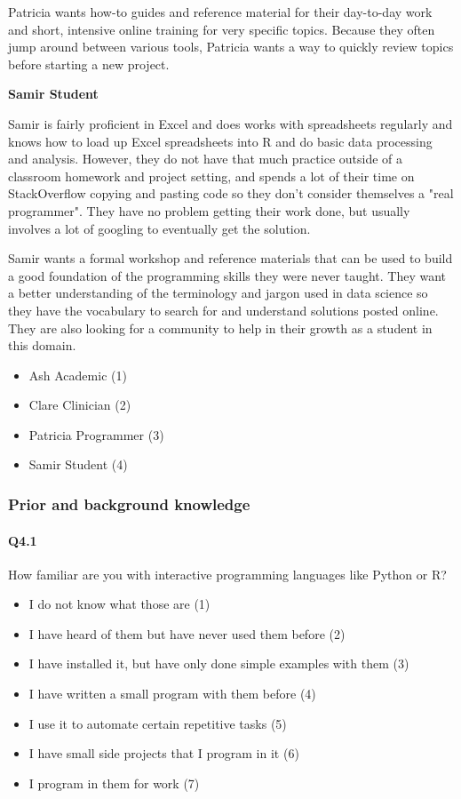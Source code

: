 \documentclass[030-workshop.tex]{subfiles}
\begin{document}
 Patricia wants how-to guides and reference material for their day-to-day work
 and short, intensive online training for very specific topics.
 Because they often jump around between various tools, Patricia wants a way to quickly review topics before starting a new project.

\textbf{Samir Student}

 Samir is fairly proficient in Excel and does works with spreadsheets regularly and
 knows how to load up Excel spreadsheets into R and do basic data processing and analysis.
 However, they do not have that much practice outside of a classroom homework and project setting,
 and spends a lot of their time on StackOverflow copying and pasting code so they don't consider themselves a "real programmer".
 They have no problem getting their work done, but usually involves a lot of googling to eventually get the solution.

 Samir wants a formal workshop and reference materials that can be used to build a good foundation of the programming skills they were never taught.
 They want a better understanding of the terminology and jargon used in data science so they have the vocabulary to
 search for and understand solutions posted online. They are also looking for a community to help in their growth as a student in this domain.

\begin{itemize}
    \item Ash Academic  (1)
    \item Clare Clinician  (2)
    \item Patricia Programmer  (3)
    \item Samir Student  (4)
\end{itemize}

\subsubsection{Prior and background knowledge}

    \paragraph{Q4.1}

    How familiar are you with interactive programming languages like Python or R?

    \begin{itemize}
        \item I do not know what those are  (1)
        \item I have heard of them but have never used them before  (2)
        \item I have installed it, but have only done simple examples with them  (3)
        \item I have written a small program with them before  (4)
        \item I use it to automate certain repetitive tasks  (5)
        \item I have small side projects that I program in it  (6)
        \item I program in them for work  (7)
    \end{itemize}
\end{document}
